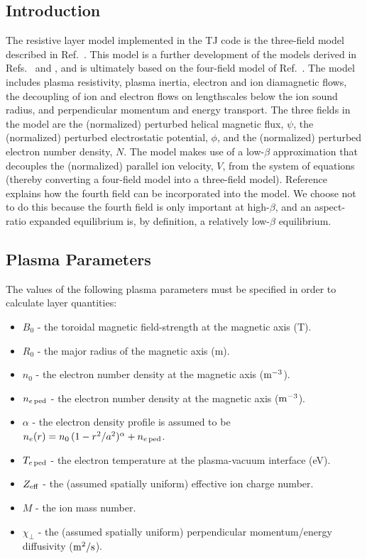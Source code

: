 \documentclass[12pt,prb,aps]{revtex4-1}
\begin{document}
\subsection{Introduction}
 The resistive layer model implemented in the TJ code is the three-field model described in Ref.~. This model is a further development of
 the models derived in Refs.~ and , and is ultimately based on the four-field model of Ref.~. 
 The model includes plasma resistivity, plasma inertia, electron and ion diamagnetic flows, the decoupling of ion and electron flows on lengthscales below the ion sound
 radius, and perpendicular momentum and energy transport. The three fields in the model are the (normalized) perturbed helical magnetic flux, $\psi$, the (normalized)
 perturbed electrostatic potential, $\phi$, and the (normalized) perturbed electron number density, $N$. The model makes use of a low-$\beta$
 approximation that decouples the (normalized) parallel ion velocity, $V$,  from the system of equations (thereby converting a four-field model into
 a three-field model). Reference~ explains how the fourth field can be incorporated into the model. We choose not to do this
 because the fourth field is only important at high-$\beta$, and an aspect-ratio expanded equilibrium is, by definition, a relatively low-$\beta$
 equilibrium. 
 
\subsection{Plasma Parameters}\label{ppara}
The values of the following plasma parameters must be specified in order to calculate layer quantities:
\begin{itemize}
\item $B_0$ - the toroidal magnetic field-strength at the magnetic axis (T).
\item $R_0$ - the major radius of the magnetic axis  (m).
\item $n_0$ - the  electron number density at the magnetic axis (${\rm m}^{-3}$).
\item $n_{e\,{\rm ped}}$ - the  electron number density at the magnetic axis (${\rm m}^{-3}$).
\item $\alpha$ - the electron density profile is assumed to be $n_e(r)=n_0\,(1-r^2/a^2)^\alpha + n_{e\,\rm ped}$.
\item $T_{e\,{\rm ped}}$ - the electron temperature at the plasma-vacuum interface (eV).
\item $Z_{\rm eff}$  - the (assumed spatially uniform) effective ion charge number.
\item $M$ - the ion mass number.
\item $\chi_\perp$ - the (assumed spatially uniform) perpendicular momentum/energy diffusivity (${\rm m}^2/{\rm s}$).
\end{itemize}
\end{document}
